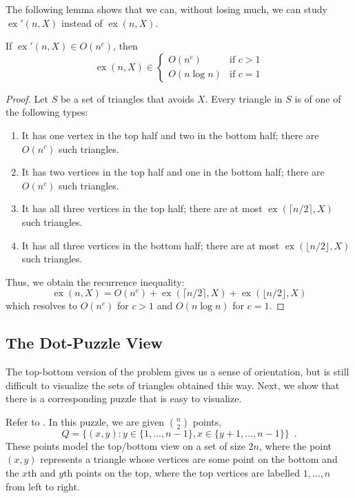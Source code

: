 \documentclass{patmorin}
\DeclareMathOperator{\ex}{ex}
\begin{document}
The following lemma shows that we can, without losing much, we can study
$\ex'(n,X)$ instead of $\ex(n,X)$.

\begin{lem}
  If $\ex'(n,X)\in O(n^c)$, then
  \[
     \ex(n,X)\in 
        \begin{cases} 
            O(n^c)     & \text{if $c>1$} \\
            O(n\log n) & \text{if $c=1$}
        \end{cases}
  \]
\end{lem}

\begin{proof}
   Let $S$ be a set of triangles that avoids $X$.  Every triangle in $S$
   is of one of the following types:
   \begin{enumerate}
      \item It has one vertex in the top half and two in the bottom half;
        there are $O(n^{c})$ such triangles.
      \item It has two vertices in the top half and one in the bottom
        half; there are $O(n^{c})$ such triangles.
      \item It has all three vertices in the top half; there are at most
        $\ex(\lceil n/2\rceil,X)$ such triangles.
      \item It has all three vertices in the bottom half; there are at
        most $\ex(\lfloor n/2\rfloor,X)$ such triangles.
   \end{enumerate}
   Thus, we obtain the recurrence inequality:
   \[  \ex(n,X) = O(n^{c}) + \ex(\lceil n/2\rceil,X) + \ex(\lfloor n/2\rfloor,X) \]
   which resolves to $O(n^c)$ for $c>1$ and $O(n\log n)$ for $c=1$.
\end{proof}


\subsection{The Dot-Puzzle View}

The top-bottom version of the problem gives us a sense of orientation,
but is still difficult to visualize the sets of triangles obtained this
way. Next, we show that there is a corresponding puzzle that is easy
to visualize.

Refer to .  In this puzzle, we are given $\binom{n}{2}$
points,
\[
    Q = \{(x,y): y\in\{1,\ldots,n-1\}, x\in\{y+1,\ldots,n-1\} \} \enspace .
\]
These points model the top/bottom view on a set of size $2n$, where the
point $(x,y)$ represents a triangle whose vertices are some point on
the bottom and the $x$th and $y$th points on the top, where the top
vertices are labelled $1,\ldots,n$ from left to right.
\end{document}
